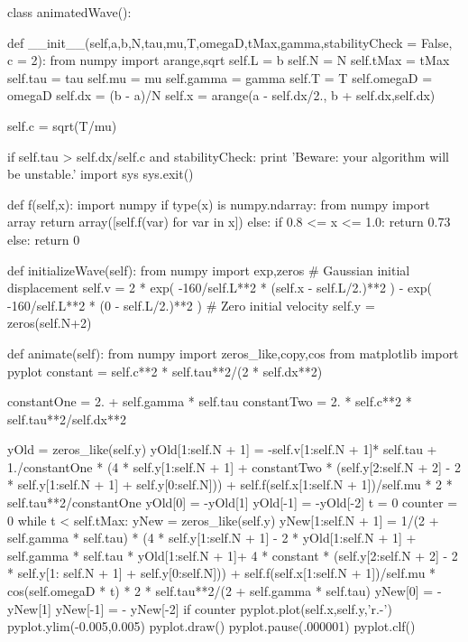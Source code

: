 \begin{codeexample}
\begin{VerbatimOut}{\listingFile}


class animatedWave():

    def __init__(self,a,b,N,tau,mu,T,omegaD,tMax,gamma,stabilityCheck = False, c = 2):
        from numpy import arange,sqrt
        self.L = b
        self.N = N
        self.tMax = tMax
        self.tau = tau
        self.mu = mu
        self.gamma = gamma
        self.T = T
        self.omegaD = omegaD
        self.dx = (b - a)/N
        self.x = arange(a - self.dx/2., b + self.dx,self.dx)

        self.c = sqrt(T/mu)

        if self.tau > self.dx/self.c and stabilityCheck:
            print 'Beware: your algorithm will be unstable.'
            import sys
            sys.exit()

    def f(self,x):
        import numpy
        if type(x) is numpy.ndarray:
            from numpy import array
            return array([self.f(var) for var in x])
        else:
            if 0.8 <= x <= 1.0:
                return 0.73
            else:
                return 0

    def initializeWave(self):
        from numpy import exp,zeros
        # Gaussian initial displacement
        self.v = 2 * exp( -160/self.L**2 * (self.x - self.L/2.)**2 ) - exp( -160/self.L**2 * (0 - self.L/2.)**2 )
        # Zero initial velocity
        self.y = zeros(self.N+2)


    def animate(self):
        from numpy import zeros_like,copy,cos
        from matplotlib import pyplot
        constant = self.c**2 * self.tau**2/(2 * self.dx**2)
        
        constantOne = 2. + self.gamma * self.tau
        constantTwo = 2. * self.c**2 * self.tau**2/self.dx**2

        yOld = zeros_like(self.y)
        yOld[1:self.N + 1] = -self.v[1:self.N + 1]* self.tau + 1./constantOne * (4 * self.y[1:self.N + 1] + constantTwo * (self.y[2:self.N + 2] - 2 * self.y[1:self.N + 1] + self.y[0:self.N])) + self.f(self.x[1:self.N + 1])/self.mu  * 2 * self.tau**2/constantOne
        yOld[0] = -yOld[1]
        yOld[-1] = -yOld[-2]
        t = 0
        counter = 0
        while t < self.tMax:
            yNew = zeros_like(self.y)
            yNew[1:self.N + 1] = 1/(2 + self.gamma * self.tau) * (4 * self.y[1:self.N + 1] - 2 * yOld[1:self.N + 1] + self.gamma * self.tau * yOld[1:self.N + 1]+ 4 * constant * (self.y[2:self.N + 2] - 2 * self.y[1: self.N + 1] + self.y[0:self.N])) + self.f(self.x[1:self.N + 1])/self.mu * cos(self.omegaD * t) * 2 * self.tau**2/(2 + self.gamma * self.tau)
            yNew[0] =  -yNew[1]
            yNew[-1] = - yNew[-2]
            if counter %
                pyplot.plot(self.x,self.y,'r.-')
                pyplot.ylim(-0.005,0.005)
                pyplot.draw()
                pyplot.pause(.000001)
                pyplot.clf()



\end{VerbatimOut}
\end{codeexample}
